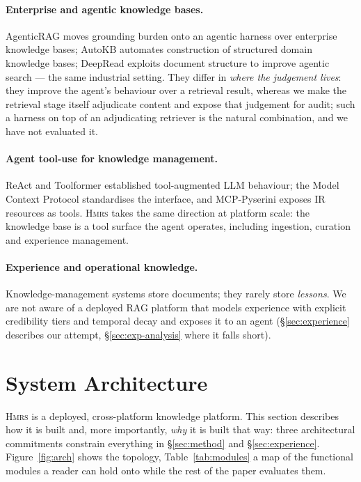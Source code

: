 \documentclass[sigconf, review, anonymous]{acmart}
\newcommand{\sys}{\textsc{Hmrs}}
\begin{document}
\paragraph{Enterprise and agentic knowledge bases.}
AgenticRAG \cite{suresh2026agenticrag} moves grounding burden onto an agentic
harness over enterprise knowledge bases;
AutoKB \cite{sahay2025autokb} automates construction of structured domain
knowledge bases; DeepRead \cite{li2026deepread} exploits document structure to
improve agentic search --- the same industrial setting. They differ
in \emph{where the judgement lives}: they improve the agent's behaviour over a
retrieval result, whereas we make the retrieval stage itself adjudicate content
and expose that judgement for audit; such a harness on top of an adjudicating
retriever is the natural combination, and we have not evaluated it.

\paragraph{Agent tool-use for knowledge management.}
ReAct \cite{yao2022react} and Toolformer \cite{schick2023toolformer}
established tool-augmented LLM behaviour; the Model Context Protocol
\cite{anthropic2024mcp} standardises the interface, and MCP-Pyserini
\cite{ge2026mcppyserini} exposes IR resources as tools. \sys{} takes the same
direction at platform scale: the knowledge base is a tool surface the agent
operates, including ingestion, curation and experience management.

\paragraph{Experience and operational knowledge.}
Knowledge-management systems store documents; they rarely store
\emph{lessons}. We are not aware of a deployed RAG platform that models
experience with explicit credibility tiers and temporal decay and exposes it
to an agent (\S\ref{sec:experience} describes our attempt,
\S\ref{sec:exp-analysis} where it falls short).

\section{System Architecture}\label{sec:system}

\sys{} is a deployed, cross-platform knowledge platform. This section describes
how it is built and, more importantly, \emph{why} it is built that way: three
architectural commitments constrain everything in \S\ref{sec:method} and
\S\ref{sec:experience}. Figure~\ref{fig:arch} shows the topology,
Table~\ref{tab:modules} a map of the
functional modules a reader can hold onto while the rest of the paper
evaluates them.
\end{document}
